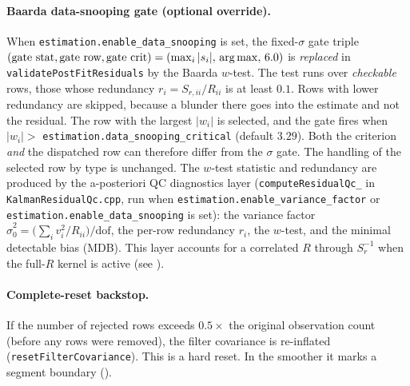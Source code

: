 \documentclass[main.tex]{subfiles}
\begin{document}
\paragraph{Baarda data-snooping gate (optional override).}
When \texttt{estimation.enable\_data\_snooping} is set, the fixed-$\sigma$
gate triple $(\text{gate stat},\text{gate row},\text{gate crit}) =
(\max_i|s_i|,\,\arg\max,\,6.0)$ is \emph{replaced} in
\texttt{validatePostFitResiduals} by the Baarda $w$-test.  The test runs
over \emph{checkable} rows, those whose redundancy
$r_i = S_{r,ii}/R_{ii}$ is at least $0.1$.  Rows with lower redundancy
are skipped, because a blunder there goes into the estimate and not the
residual.  The row with the largest $|w_i|$ is selected, and the gate
fires when $|w_i| > $ \texttt{estimation.data\_snooping\_critical}
(default $3.29$).  Both the criterion \emph{and} the dispatched row can
therefore differ from the $\sigma$ gate.  The handling of the selected
row by type is unchanged.  The $w$-test statistic and
redundancy are produced by the a-posteriori QC diagnostics layer
(\texttt{computeResidualQc\_} in \texttt{KalmanResidualQc.cpp}, run when
\texttt{estimation.enable\_variance\_factor} or
\texttt{estimation.enable\_data\_snooping} is set): the variance factor
$\hat\sigma_0^2 = \big(\sum_i v_i^2/R_{ii}\big)/\mathrm{dof}$, the per-row
redundancy $r_i$, the $w$-test, and the minimal detectable bias (MDB).
This layer accounts for a correlated $R$ through $S_r^{-1}$ when the
full-$R$ kernel is active (see ).

\paragraph{Complete-reset backstop.}
If the number of rejected rows exceeds $0.5 \times{}$ the original
observation count (before any rows were removed), the filter covariance
is re-inflated (\texttt{resetFilterCovariance}).  This is a hard reset.
In the smoother it marks a segment boundary
().
\end{document}
